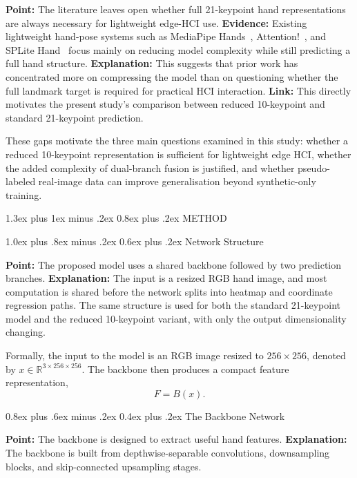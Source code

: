 \documentclass[10pt,letterpaper]{article}
\makeatletter
\renewcommand\section{\@startsection{section}{1}{\z@}%
  {1.3ex plus 1ex minus .2ex}%
  {0.8ex plus .2ex}%
  {\centering\normalfont\small\scshape}}
\renewcommand\subsection{\@startsection{subsection}{2}{\z@}%
  {1.0ex plus .8ex minus .2ex}%
  {0.6ex plus .2ex}%
  {\normalfont\itshape}}
\renewcommand\subsubsection{\@startsection{subsubsection}{3}{\z@}%
  {0.8ex plus .6ex minus .2ex}%
  {0.4ex plus .2ex}%
  {\normalfont\small\itshape}}
\makeatother
\begin{document}
\medskip
\noindent\textbf{Point:} The literature leaves open whether full 21-keypoint hand representations are always necessary for lightweight edge-HCI use.  
\textbf{Evidence:} Existing lightweight hand-pose systems such as MediaPipe Hands~\cite{mediapipe}, Attention!~\cite{attentionlite}, and SPLite Hand~\cite{splitehand} focus mainly on reducing model complexity while still predicting a full hand structure.  
\textbf{Explanation:} This suggests that prior work has concentrated more on compressing the model than on questioning whether the full landmark target is required for practical HCI interaction.  
\textbf{Link:} This directly motivates the present study's comparison between reduced 10-keypoint and standard 21-keypoint prediction.

\medskip
These gaps motivate the three main questions examined in this study: whether a reduced 10-keypoint representation is sufficient for lightweight edge HCI, whether the added complexity of dual-branch fusion is justified, and whether pseudo-labeled real-image data can improve generalisation beyond synthetic-only training.


\section{METHOD}

\subsection{Network Structure}

\noindent\textbf{Point:} The proposed model uses a shared backbone followed by two prediction branches.  
\textbf{Explanation:} The input is a resized RGB hand image, and most computation is shared before the network splits into heatmap and coordinate regression paths. The same structure is used for both the standard 21-keypoint model and the reduced 10-keypoint variant, with only the output dimensionality changing.

Formally, the input to the model is an RGB image resized to $256 \times 256$, denoted by $x \in \mathbb{R}^{3 \times 256 \times 256}$. The backbone then produces a compact feature representation,
\[
F = B(x).
\]

\subsubsection{The Backbone Network}

\noindent\textbf{Point:} The backbone is designed to extract useful hand features.  
\textbf{Explanation:} The backbone is built from depthwise-separable convolutions, downsampling blocks, and skip-connected upsampling stages.
\end{document}
